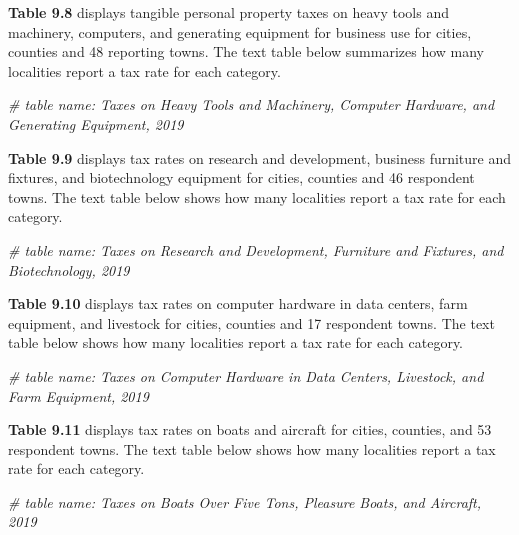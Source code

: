 \documentclass[
]{book}
\newenvironment{Shaded}{\begin{snugshade}}{\end{snugshade}}
\newcommand{\CommentTok}[1]{\textcolor[rgb]{0.56,0.35,0.01}{\textit{#1}}}
\begin{document}
\textbf{Table 9.8} displays tangible personal property taxes on heavy tools and machinery, computers, and generating equipment for business use for cities, counties and 48 reporting towns. The text table below summarizes how many localities report a tax rate for each category.

\begin{Shaded}
\begin{Highlighting}[]
\CommentTok{\# table name: Taxes on Heavy Tools and Machinery, Computer Hardware, and Generating Equipment, 2019}
\end{Highlighting}
\end{Shaded}

\textbf{Table 9.9} displays tax rates on research and development, business furniture and fixtures, and biotechnology equipment for cities, counties and 46 respondent towns. The text table below shows how many localities report a tax rate for each category.

\begin{Shaded}
\begin{Highlighting}[]
\CommentTok{\# table name: Taxes on Research and Development, Furniture and Fixtures, and Biotechnology, 2019}
\end{Highlighting}
\end{Shaded}

\textbf{Table 9.10} displays tax rates on computer hardware in data centers, farm equipment, and livestock for cities, counties and 17 respondent towns. The text table below shows how many localities report a tax rate for each category.

\begin{Shaded}
\begin{Highlighting}[]
\CommentTok{\# table name: Taxes on Computer Hardware in Data Centers, Livestock, and Farm Equipment, 2019}
\end{Highlighting}
\end{Shaded}

\textbf{Table 9.11} displays tax rates on boats and aircraft for cities, counties, and 53 respondent towns. The text table below shows how many localities report a tax rate for each category.

\begin{Shaded}
\begin{Highlighting}[]
\CommentTok{\# table name: Taxes on Boats Over Five Tons, Pleasure Boats, and Aircraft, 2019}
\end{Highlighting}
\end{Shaded}
\end{document}
